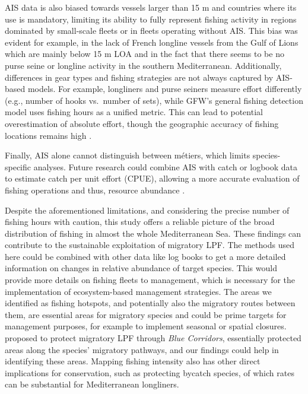 AIS data is also biased towards vessels larger than 15 m and countries where its use is mandatory,
limiting its ability to fully represent fishing activity in regions dominated by small-scale fleets
or in fleets operating without AIS\@. This bias was evident for example, in the lack of French
longline vessels from the Gulf of Lions which are mainly below 15 m LOA \citep{french_longlines}
and in the fact that there seems to be no purse seine or longline activity in the southern
Mediterranean. Additionally, differences in gear types and fishing strategies are not always
captured by AIS-based models. For example, longliners and purse seiners measure effort differently
(e.g., number of hooks vs.\ number of sets), while GFW's general fishing detection model uses
fishing hours as a unified metric. This can lead to potential overestimation of absolute effort,
though the geographic accuracy of fishing locations remains high \citep{bias}.

\medskip

Finally, AIS alone cannot distinguish between métiers, which limits species-specific analyses.
Future research could combine AIS with catch or logbook data to estimate catch per unit effort
(CPUE), allowing a more accurate evaluation of fishing operations and thus, resource abundance
\citep{niu_ais_cpue}.

\medskip

Despite the aforementioned limitations, and considering the precise number of fishing hours with
caution, this study offers a reliable picture of the broad distribution of fishing in almost the
whole Mediterranean Sea. These findings can contribute to the sustainable exploitation of migratory
LPF\@. The methods used here could be combined with other data like log books to get a more
detailed information on changes in relative abundance of target species. This would provide more
details on fishing fleets to management, which is necessary for the implementation of
ecosystem-based management strategies. The areas we identified as fishing hotspots, and potentially
also the migratory routes between them, are essential areas for migratory species and could be
prime targets for management purposes, for example to implement seasonal or spatial closures.
\cite{relano_pauly} proposed to protect migratory LPF through \textit{Blue Corridors}, essentially
protected areas along the species' migratory pathways, and our findings could help in identifying
these areas. Mapping fishing intensity also has other direct implications for conservation, such as
protecting bycatch species, of which rates can be substantial for Mediterranean longliners.